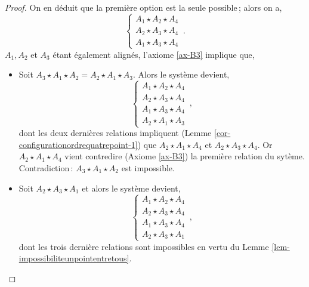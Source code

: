 \begin{cor}
\begin{proof}
        On en déduit que la première option est la seule possible\,; alors on a,
        \begin{equation*}
            \left\{
            \begin{array}{c}
                 A_1 \star A_2 \star A_4 \\
                 A_2 \star A_3 \star A_4 \\
                 A_1 \star A_3 \star A_4 
            \end{array}
            \right. \,.
        \end{equation*}
        $A_1,A_2$ et $A_3$ étant également alignés, l'axiome \ref{ax-B3} implique que, 
        \begin{itemize}[$\bullet$]
            \item Soit $A_3 \star A_1 \star A_2 = A_2 \star A_1 \star A_3$. Alors le système devient,
            \begin{equation*}
            \left\{
            \begin{array}{c}
                 A_1 \star A_2 \star A_4 \\
                 A_2 \star A_3 \star A_4 \\
                 A_1 \star A_3 \star A_4 \\
                 A_2 \star A_1 \star A_3
            \end{array}
            \right. \,,
            \end{equation*}
            dont les deux dernières relations impliquent (Lemme \ref{cor-configurationordrequatrepoint-1}) que $A_2 \star A_1 \star A_4$ et $A_2 \star A_3 \star A_4$. Or $A_2 \star A_1 \star A_4$ vient contredire (Axiome \ref{ax-B3}) la première relation du sytème. Contradiction\,: $A_3 \star A_1 \star A_2$ est impossible.
            \item Soit $A_2 \star A_3 \star A_1$ et alors le système devient,
            \begin{equation*}
            \left\{
            \begin{array}{c}
                 A_1 \star A_2 \star A_4 \\
                 A_2 \star A_3 \star A_4 \\
                 A_1 \star A_3 \star A_4 \\
                 A_2 \star A_3 \star A_1
            \end{array}
            \right. \,,
            \end{equation*}
            dont les trois dernière relations sont impossibles en vertu du Lemme \ref{lem-impossibiliteunpointentretous}.

\end{itemize}
\end{proof}
\end{cor}
